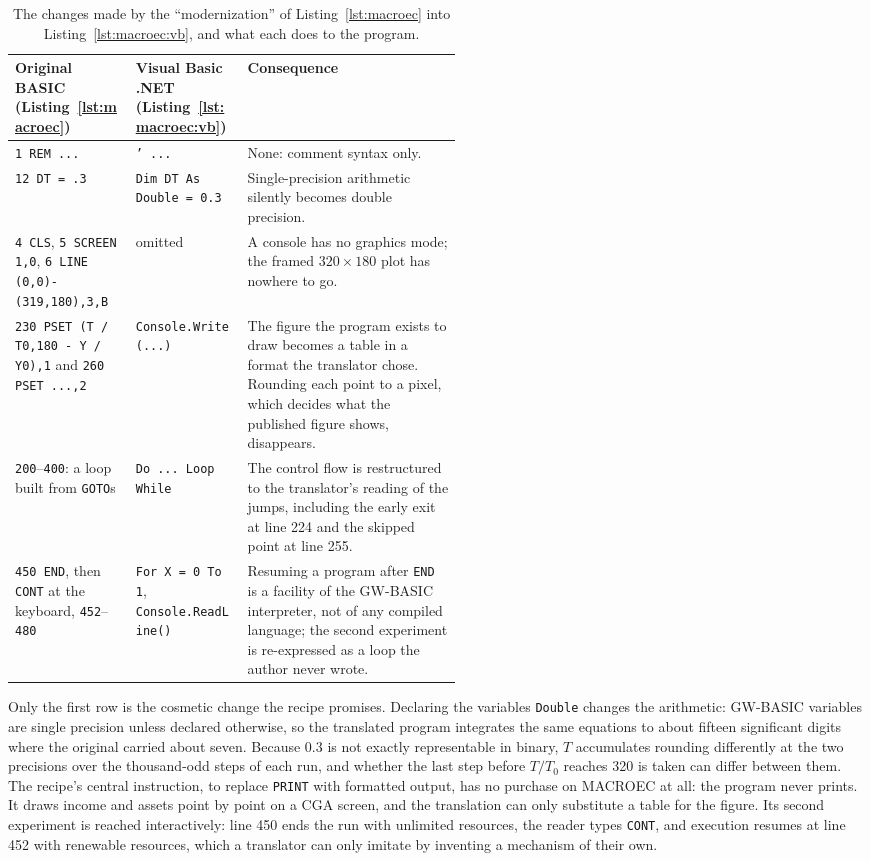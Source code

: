 \documentclass[3p,times,authoryear,twocolumn]{elsarticle}
\begin{document}
\begin{table}[t]
\centering\small
\begin{tabularx}{\linewidth}{@{}p{0.27\linewidth}p{0.25\linewidth}X@{}}
\toprule
Original BASIC (Listing~\ref{lst:macroec}) & Visual Basic .NET (Listing~\ref{lst:macroec:vb}) & Consequence \\
\midrule
\texttt{1 REM ...} & \texttt{' ...} & None: comment syntax only. \\
\texttt{12 DT = .3} & \texttt{Dim DT As Double = 0.3} & Single-precision arithmetic silently becomes double precision. \\
\texttt{4 CLS}, \texttt{5 SCREEN 1,0}, \texttt{6 LINE (0,0)-(319,180),3,B} & omitted & A console has no graphics mode; the framed $320\times180$ plot has nowhere to go. \\
\texttt{230 PSET (T / T0,180 - Y / Y0),1} and \texttt{260 PSET ...,2} & \texttt{Console.Write(...)} & The figure the program exists to draw becomes a table in a format the translator chose. Rounding each point to a pixel, which decides what the published figure shows, disappears. \\
\texttt{200}--\texttt{400}: a loop built from \texttt{GOTO}s & \texttt{Do ... Loop While} & The control flow is restructured to the translator's reading of the jumps, including the early exit at line 224 and the skipped point at line 255. \\
\texttt{450 END}, then \texttt{CONT} at the keyboard, \texttt{452}--\texttt{480} & \texttt{For X = 0 To 1}, \texttt{Console.ReadLine()} & Resuming a program after \texttt{END} is a facility of the GW-BASIC interpreter, not of any compiled language; the second experiment is re-expressed as a loop the author never wrote. \\
\bottomrule
\end{tabularx}
\caption{The changes made by the ``modernization'' of Listing~\ref{lst:macroec} into Listing~\ref{lst:macroec:vb}, and what each does to the program.}
\label{tab:modernize}
\end{table}

Only the first row is the cosmetic change the recipe promises. Declaring the variables \texttt{Double} changes the arithmetic: GW-BASIC variables are single precision unless declared otherwise, so the translated program integrates the same equations to about fifteen significant digits where the original carried about seven. Because $0.3$ is not exactly representable in binary, $T$ accumulates rounding differently at the two precisions over the thousand-odd steps of each run, and whether the last step before $T/T_0$ reaches 320 is taken can differ between them. The recipe's central instruction, to replace \texttt{PRINT} with formatted output, has no purchase on MACROEC at all: the program never prints. It draws income and assets point by point on a CGA screen, and the translation can only substitute a table for the figure. Its second experiment is reached interactively: line 450 ends the run with unlimited resources, the reader types \texttt{CONT}, and execution resumes at line 452 with renewable resources, which a translator can only imitate by inventing a mechanism of their own.
\end{document}
